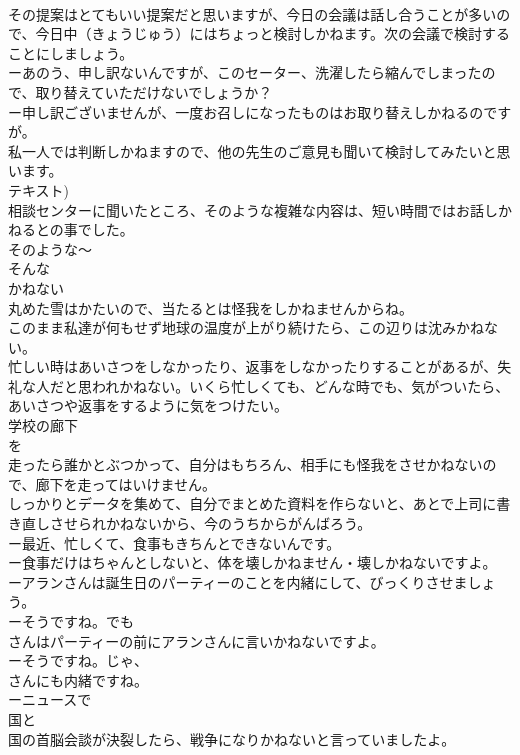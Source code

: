 \documentclass[8pt]{extreport}
\begin{document}
\begin{CJK}{UTF8}{min}
\\	その提案はとてもいい提案だと思いますが、今日の会議は話し合うことが多いので、今日中（きょうじゅう）にはちょっと検討しかねます。次の会議で検討することにしましょう。
\\	ーあのう、申し訳ないんですが、このセーター、洗濯したら縮んでしまったので、取り替えていただけないでしょうか？
\\	ー申し訳ございませんが、一度お召しになったものはお取り替えしかねるのですが。　
\\	私一人では判断しかねますので、他の先生のご意見も聞いて検討してみたいと思います。 
\\	テキスト)
\\	相談センターに聞いたところ、そのような複雑な内容は、短い時間ではお話しかねるとの事でした。
\\	そのような～
\\	そんな
\\	かねない
\\	丸めた雪はかたいので、当たるとは怪我をしかねませんからね。
\\	このまま私達が何もせず地球の温度が上がり続けたら、この辺りは沈みかねない。
\\	忙しい時はあいさつをしなかったり、返事をしなかったりすることがあるが、失礼な人だと思われかねない。いくら忙しくても、どんな時でも、気がついたら、あいさつや返事をするように気をつけたい。
\\	学校の廊下
\\	を
\\	走ったら誰かとぶつかって、自分はもちろん、相手にも怪我をさせかねないので、廊下を走ってはいけません。
\\	しっかりとデータを集めて、自分でまとめた資料を作らないと、あとで上司に書き直しさせられかねないから、今のうちからがんばろう。
\\	ー最近、忙しくて、食事もきちんとできないんです。
\\	ー食事だけはちゃんとしないと、体を壊しかねません・壊しかねないですよ。
\\	ーアランさんは誕生日のパーティーのことを内緒にして、びっくりさせましょう。
\\	ーそうですね。でも
\\	さんはパーティーの前にアランさんに言いかねないですよ。
\\	ーそうですね。じゃ、
\\	さんにも内緒ですね。
\\	ーニュースで
\\	国と
\\	国の首脳会談が決裂したら、戦争になりかねないと言っていましたよ。

\end{CJK}
\end{document}
